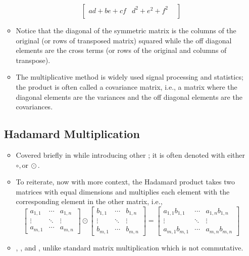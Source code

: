 \begin{itemize}
\begin{itemize}
\[\begin{bmatrix}
      ad+be+cf & d^2+e^2+f^2 &  \\
      \end{bmatrix}
      \]%
      \item Notice that the diagonal of the symmetric matrix is the columns of the original (or rows of transposed matrix) squared while the off diagonal elements are the cross terms (or rows of the original and columns of transpose).
      \item The multiplicative method is widely used signal processing and statistics; the product is often called a covariance matrix, i.e., a matrix where the diagonal elements are the variances and the off diagonal elements are the covariances.
  \end{itemize}
  
  \subsection{Hadamard Multiplication}\label{Hadamard Multiplication}
  \begin{itemize}
    \item Covered briefly in while introducing other \hyperref[Properties of Vectors]{}; it is often denoted with either \( \circ, \text{or}~\odot \).
    \item To reiterate, now with more context, the Hadamard product takes two matrices with equal dimensions and multiplies each element with the corresponding element in the other matrix, i.e.,
    \[%
    \begin{bmatrix}
    a_{1,1}  & \cdots & a_{1,n} \\
    \vdots & \ddots & \vdots \\
    a_{m,1}  & \cdots & a_{m,n}
    \end{bmatrix}
    \odot
    \begin{bmatrix}
      b_{1,1}  & \cdots & b_{1,n} \\
      \vdots & \ddots & \vdots \\
      b_{m,1}  & \cdots & b_{m,n}
    \end{bmatrix}
    =
    \begin{bmatrix}
      a_{1,1}b_{1,1}  & \cdots & a_{1,n}b_{1,n} \\
      \vdots & \ddots & \vdots \\
      a_{m,1} b_{m,1}  & \cdots & a_{m,n}b_{m,n}
    \end{bmatrix}
    \]%
    \item {}, , and , unlike standard matrix multiplication which is not commutative.
  \end{itemize}
\end{itemize}